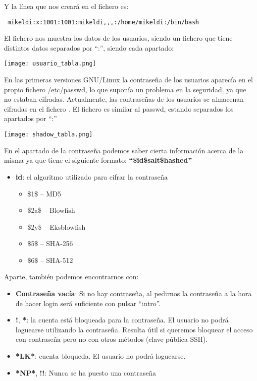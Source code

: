 Y la línea que nos creará en el fichero     es:
\begin{tcolorbox}[colback=white,title=Ejemplo de usaurio en “/etc/passwd”]
 \texttt{ mikeldi:x:1001:1001:mikeldi,,,:/home/mikeldi:/bin/bash }
\end{tcolorbox}

El fichero   nos muestra los datos de los usuarios, siendo un fichero que tiene distintos datos separados por “:”, siendo cada apartado:

\begin{center}
  \texttt{[image: usuario\_tabla.png]}
\end{center}


En las primeras versiones GNU/Linux la contraseña de los usuarios aparecía en el propio fichero /etc/passwd, lo que suponía un problema en la seguridad, ya que no estaban cifradas. Actualmente, las contraseñas de los usuarios se almacenan cifradas en el fichero . El fichero es similar al passwd, estando separados los apartados por “:”


\begin{center}
  \texttt{[image: shadow\_tabla.png]}
\end{center}


En el apartado de la contraseña podemos saber cierta información acerca de la misma ya que tiene el siguiente formato: \textbf{“\$id\$salt\$hashed”}
\begin{itemize}
    \item \textbf{id}: el algoritmo utilizado para cifrar la contraseña
    \begin{itemize}
        \item \$1\$ – MD5
        \item \$2a\$ – Blowfish
        \item \$2y\$ – Eksblowfish
        \item \$5\$ – SHA-256
        \item \$6\$ – SHA-512
    \end{itemize}
\end{itemize}

Aparte, también podemos encontrarnos con:
\begin{itemize}
    \item \textbf{Contraseña vacía}:  Si no hay contraseña, al pedirnos la contraseña a la hora de hacer login será suficiente con pulsar “intro”.
    \item \textbf{!}, \textbf{*}: la cuenta está bloqueada para la contraseña. El usuario no podrá loguearse utilizando la contraseña. Resulta útil si queremos bloquear el acceso con contraseña pero no con otros métodos (clave pública SSH).
    \item \textbf{*LK*}: cuenta bloqueda. El usuario no podrá loguearse.
    \item \textbf{*NP*}, \textbf{!!}: Nunca se ha puesto una contraseña
\end{itemize}


